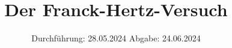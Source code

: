 

\subject{V601}
\title{Der Franck-Hertz-Versuch}
\date{%
  Durchführung: 28.05.2024
  \hspace{3em}
  Abgabe: 24.06.2024
}



\maketitle
\thispagestyle{empty}
\tableofcontents
\newpage






\printbibliography{}
\appendix
\setcounter{secnumdepth}{0}
%
